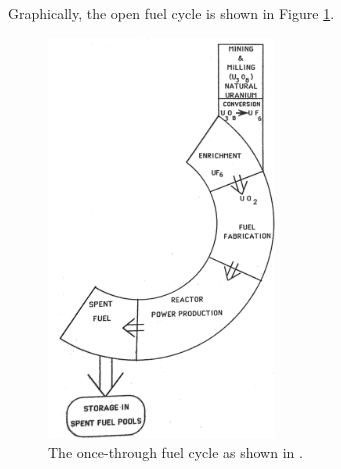 Graphically, the open fuel cycle is shown in Figure \ref{fig:open-cycle}.

\begin{figure}[]
  \begin{center}
    \includegraphics[width=6cm]{./chapters/intro/open_cycle.png}
  \caption{The once-through fuel cycle as shown in \cite{cochran1990nuclear}.}
  \label{fig:open-cycle}
  \end{center}
\end{figure}
